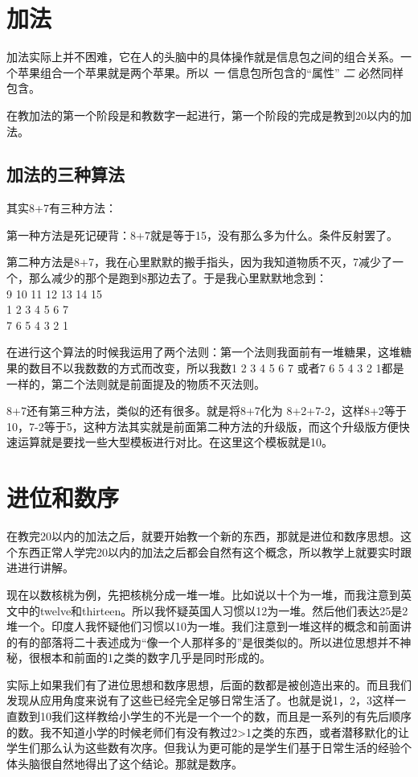\documentclass[11pt,oneside]{article}
\begin{document}
\section{加法}
\label{sec-3}
加法实际上并不困难，它在人的头脑中的具体操作就是信息包之间的组合关系。一个苹果组合一个苹果就是两个苹果。所以 \emph{一} 信息包所包含的“属性” \emph{二} 必然同样包含。

在教加法的第一个阶段是和教数字一起进行，第一个阶段的完成是教到20以内的加法。

\subsection{加法的三种算法}
\label{sec-3-1}
其实8+7有三种方法：

第一种方法是死记硬背：8+7就是等于15，没有那么多为什么。条件反射罢了。

第二种方法是8+7，我在心里默默的搬手指头，因为我知道物质不灭，7减少了一个，那么减少的那个是跑到8那边去了。于是我心里默默地念到：\\
9 10 11 12 13 14 15\\
1 2   3   4   5   6  7 \\
7 6  5    4   3  2   1

在进行这个算法的时候我运用了两个法则：第一个法则我面前有一堆糖果，这堆糖果的数目不以我数数的方式而改变，所以我数1 2 3 4 5 6 7 或者7 6 5 4 3 2 1都是一样的，第二个法则就是前面提及的物质不灭法则。

8+7还有第三种方法，类似的还有很多。就是将8+7化为 8+2+7-2，这样8+2等于10，7-2等于5，这种方法其实就是前面第二种方法的升级版，而这个升级版方便快速运算就是要找一些大型模板进行对比。在这里这个模板就是10。


\section{进位和数序}
\label{sec-4}
在教完20以内的加法之后，就要开始教一个新的东西，那就是进位和数序思想。这个东西正常人学完20以内的加法之后都会自然有这个概念，所以教学上就要实时跟进进行讲解。

现在以数核桃为例，先把核桃分成一堆一堆。比如说以十个为一堆，而我注意到英文中的twelve和thirteen。所以我怀疑英国人习惯以12为一堆。然后他们表达25是2堆一个。印度人我怀疑他们习惯以10为一堆。我们注意到一堆这样的概念和前面讲的有的部落将二十表述成为“像一个人那样多的”是很类似的。所以进位思想并不神秘，很根本和前面的1之类的数字几乎是同时形成的。

实际上如果我们有了进位思想和数序思想，后面的数都是被创造出来的。而且我们发现从应用角度来说有了这些已经完全足够日常生活了。也就是说1，2，3这样一直数到10我们这样教给小学生的不光是一个一个的数，而且是一系列的有先后顺序的数。我不知道小学的时候老师们有没有教过2>1之类的东西，或者潜移默化的让学生们那么认为这些数有次序。但我认为更可能的是学生们基于日常生活的经验个体头脑很自然地得出了这个结论。那就是数序。
\end{document}
